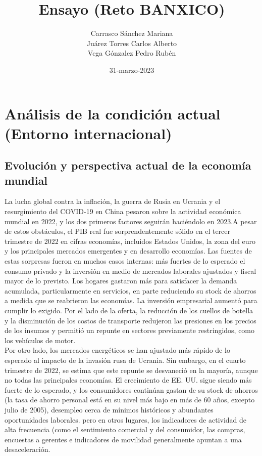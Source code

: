 \documentclass{article}
\title{Ensayo (Reto BANXICO) }
\author{Carrasco Sánchez Mariana\\
Juárez Torres Carlos Alberto\\
Vega Gónzalez Pedro Rubén}
\date{31-marzo-2023}
\theoremstyle{mytheoremstyle}
\theoremstyle{mytheoremstyle}
\theoremstyle{myproblemstyle}
\begin{document}
    \maketitle
  \section{Análisis de la condición actual (Entorno internacional)}

  \subsection{Evolución y perspectiva actual de la economía mundial}

  La lucha global contra la inflación, la guerra de Rusia en Ucrania y el resurgimiento del COVID-19 en China pesaron sobre la actividad económica mundial en 2022, y los dos primeros factores seguirán haciéndolo en 2023.A pesar de estos obstáculos, el PIB real fue sorprendentemente sólido en el tercer trimestre de 2022 en cifras
economías, incluidos Estados Unidos, la zona del euro y los principales mercados emergentes y en desarrollo economías. Las fuentes de estas sorpresas fueron en muchos casos internas: más fuertes de lo esperado el consumo privado y la inversión en medio de mercados laborales ajustados y fiscal mayor de lo previsto. Los hogares gastaron más para satisfacer la demanda acumulada, particularmente en servicios, en parte reduciendo su stock de ahorros a medida que se reabrieron las economías. La inversión empresarial aumentó para cumplir lo exigido. Por el lado de la oferta, la reducción de los cuellos de botella y la disminución de los costos de transporte redujeron las presiones en los precios de los insumos y permitió un repunte en sectores previamente restringidos, como los vehículos de motor.\\

Por otro lado, los mercados energéticos se han ajustado más rápido de lo esperado al impacto de la invasión rusa de Ucrania. Sin embargo, en el cuarto trimestre de 2022, se estima que este repunte se desvaneció en la mayoría, aunque no todas las principales economías. El crecimiento de EE. UU. sigue siendo más fuerte de lo esperado, y los consumidores continúan gastan de su stock de ahorros (la tasa de ahorro personal está en su nivel más bajo en más de 60 años, excepto julio de 2005), desempleo cerca de mínimos históricos y abundantes oportunidades laborales. pero en otros lugares, los indicadores de actividad de alta frecuencia (como el sentimiento comercial y del consumidor, las compras, encuestas a gerentes e indicadores de movilidad generalmente apuntan a una desaceleración.\\
\end{document}
